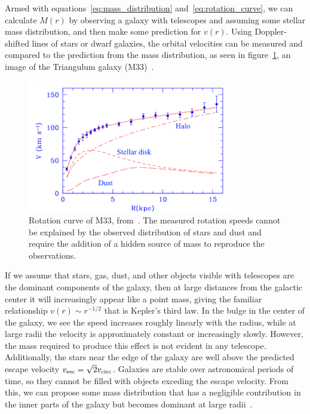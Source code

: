 Armed with equations~\eqref{eq:mass_distribution} and~\eqref{eq:rotation_curve}, we can calculate $M(r)$ by observing a galaxy with telescopes and assuming some stellar mass distribution, and then make some prediction for $v(r)$. Using Doppler-shifted lines of stars or dwarf galaxies, the orbital velocities can be measured and compared to the prediction from the mass distribution, as seen in figure~\ref{fig:rotation_curve}, an image of the Triangulum galaxy (M33)~\cite{Corbelli:1999af}.

\begin{figure}[htbp]
\centering
    \includegraphics[width=0.8\textwidth]{figures/dm/m33_rotation}
    \caption{Rotation curve of M33, from~\cite{Corbelli:1999af}. The measured rotation speeds cannot be explained by the observed distribution of stars and dust and require the addition of a hidden source of mass to reproduce the observations.}\label{fig:rotation_curve}
\end{figure}

If we assume that stars, gas, dust, and other objects visible with telescopes are the dominant components of the galaxy, then at large distances from the galactic center it will increasingly appear like a point mass, giving the familiar relationship $v(r) \sim r^{-1/2}$ that is Kepler's third law. In the bulge in the center of the galaxy, we see the speed increases roughly linearly with the radius, while at large radii the velocity is approximately constant or increasingly slowly. However, the mass required to produce this effect is not evident in any telescope. Additionally, the stars near the edge of the galaxy are well above the predicted escape velocity $v_{\mathrm{esc}} = \sqrt{2}v_{\mathrm{circ}}$. Galaxies are stable over astronomical periods of time, so they cannot be filled with objects exceding the escape velocity. From this, we can propose some mass distribution that has a negligible contribution in the inner parts of the galaxy but becomes dominant at large radii~\cite{Navarro:1995iw,Graham:2005xx}.

